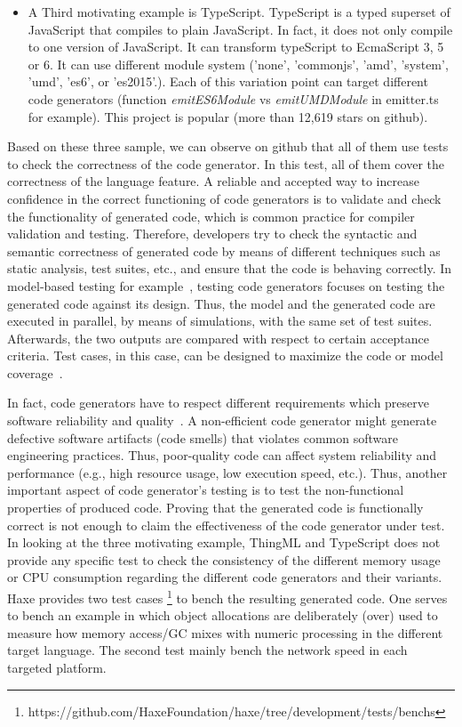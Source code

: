 \begin{itemize}
\item A Third motivating example is TypeScript. TypeScript is a typed superset of JavaScript that compiles to plain JavaScript. In fact, it does not only compile to one version of JavaScript. It can transform typeScript to EcmaScript 3, 5 or 6. It can use different module system ('none', 'commonjs', 'amd', 'system', 'umd', 'es6', or 'es2015'.). Each of this variation point can target different code generators (function \textit{emitES6Module} vs \textit{emitUMDModule} in emitter.ts for example). This project is popular (more than 12,619 stars on github).

\end{itemize}

Based on these three sample, we can observe on github that all of them use tests to check the correctness of the code generator. In this test, all of them cover the correctness of the language feature.  A reliable and accepted way to increase confidence in the correct functioning of code generators is to validate and check the functionality of generated code, which is common practice for compiler validation and testing.
Therefore, developers try to check the syntactic and semantic correctness of generated code by means of different techniques such as static analysis, test suites, etc., and ensure that the code is behaving correctly.  In model-based testing for example~\cite{jorges2014back,stuermer2007systematic}, testing code generators focuses on testing the generated code against its design. Thus, the model and the generated code are executed in parallel, by means of simulations, with the same set of test suites. Afterwards, the two outputs are compared with respect to certain acceptance criteria. Test cases, in this case, can be designed to maximize the code or model coverage~\cite{sturmer2005overview}.

In fact, code generators have to respect different requirements which preserve software reliability and quality~\cite{demertzi2011analyzing}. A non-efficient code generator might generate defective software artifacts (code smells) that violates common software engineering practices. Thus, poor-quality code can affect system reliability and performance (e.g., high resource usage, low execution speed, etc.). Thus, another important aspect of code generator's testing is to test the non-functional properties of produced code. Proving that the generated code is functionally correct is not enough to claim the effectiveness of the code generator under test. In looking at the three motivating example, ThingML and TypeScript does not provide any specific test to check the consistency of the different memory usage or CPU consumption regarding the different code generators and their variants. Haxe provides two test cases \footnote{https://github.com/HaxeFoundation/haxe/tree/development/tests/benchs} to bench the resulting generated code. One serves to bench an example in which object allocations are deliberately (over) used to measure how memory access/GC mixes with numeric processing in the different target language. The second test mainly bench the network speed in each targeted platform. 

